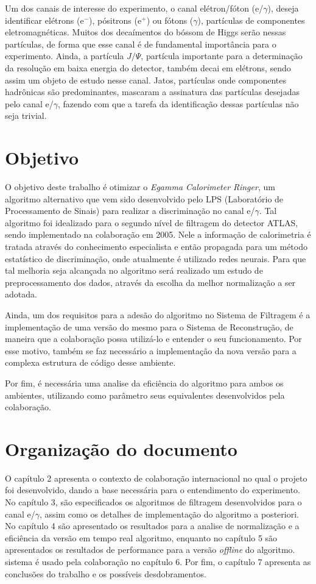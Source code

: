 Um dos canais de interesse do experimento, o canal elétron/fóton (e/$\gamma$),
deseja identificar elétrons (e$^-$), pósitrons (e$^+$) ou fótons ($\gamma$), 
partículas de componentes eletromagnéticas. Muitos dos decaímentos do bóssom de
Higgs serão nessas partículas, de forma que esse canal é de fundamental
importância para o experimento. Ainda, a partícula $J/\Psi$, partícula importante
para a determinação da resolução em baixa energia do detector, 
também decai em elétrons, sendo assim um objeto de estudo nesse canal.
Jatos, partículas onde componentes hadrônicas são predominantes, 
mascaram a assinatura das partículas desejadas pelo canal e/$\gamma$, fazendo 
com que a tarefa da identificação dessas partículas não seja trivial.

\section{Objetivo} %

O objetivo deste trabalho é otimizar o \emph{Egamma Calorimeter Ringer},
um algoritmo alternativo que vem sido desenvolvido pelo LPS (Laboratório 
de Processamento de Sinais) para realizar a discriminação 
no canal e/$\gamma$. Tal algoritmo foi idealizado para o segundo
nível de filtragem do detector ATLAS, sendo implementado na colaboração em 2005.
Nele a informação de calorimetria é tratada através do conhecimento especialista
e então propagada para um método estatístico 
de discriminação, onde atualmente é utilizado redes neurais. 
Para que tal melhoria seja alcançada no
algoritmo será realizado um estudo de preprocessamento dos dados,
através da escolha da melhor normalização a ser adotada.

Ainda, um dos requisitos para a adesão do algoritmo no Sistema de Filtragem é a
implementação de uma versão do mesmo para o Sistema de Reconstrução,
de maneira  que a colaboração possa utilizá-lo e entender o seu
funcionamento. Por esse motivo, também se faz necessário a implementação 
da nova versão para a complexa estrutura de código desse ambiente.

Por fim, é necessária uma analise da eficiência do algoritmo para ambos os
ambientes, utilizando como parâmetro seus equivalentes desenvolvidos pela colaboração.

\section{Organização do documento} %

O capítulo 2 apresenta o contexto de colaboração internacional no qual o projeto
foi desenvolvido, dando a base necessária para o entendimento do experimento. No
capítulo 3, são especificados os algoritmos de filtragem desenvolvidos para o
canal e/$\gamma$, assim como os detalhes de implementação do algoritmo
a posteriori. No capítulo 4 são apresentado os resultados para a analise de
normalização e a eficiência da versão em tempo real algoritmo, enquanto no
capítulo 5 são apresentados os resultados de performance para a versão {\it
offline} do algoritmo. 
sistema é usado pela colaboração no capítulo 6. Por fim, o capítulo 7 apresenta
as conclusões do trabalho e os possíveis desdobramentos.

